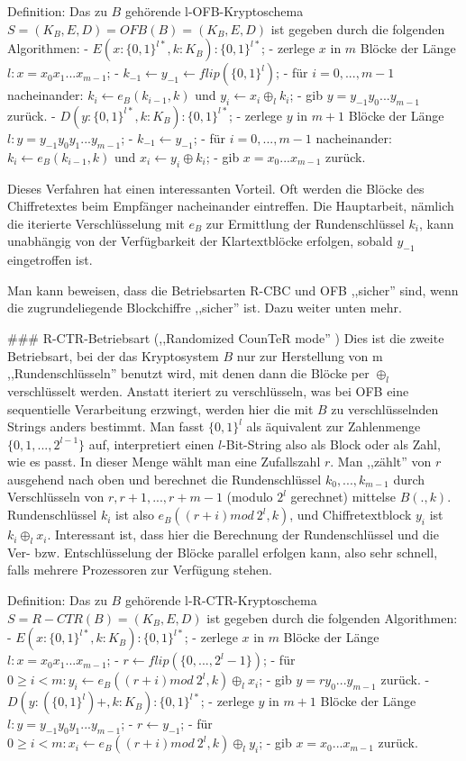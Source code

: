 \documentclass[a4paper]{article}
\begin{document}
\begin{multicols}{3}
        Definition: Das zu $B$ gehörende l-OFB-Kryptoschema $S=(K_B,E,D) =OFB(B) =(K_B,E,D)$ ist gegeben durch die folgenden Algorithmen:
        - $E(x:\{0,1\}^{l*},k:K_B) :\{0,1\}^{l*}$;
        - zerlege $x$ in $m$ Blöcke der Länge $l:x=x_0 x_1 ...x_{m-1}$;
        - $k_{-1} \leftarrow y_{-1} \leftarrow flip(\{0,1\}^l)$;
        - für $i=0,...,m-1$ nacheinander: $k_i\leftarrow e_B(k_{i-1},k)$ und $y_i\leftarrow x_i\oplus_l k_i$;
        - gib $y=y_{-1} y_0 ...y_{m-1}$ zurück.
        - $D(y:\{0,1\}^{l*},k:K_B) :\{0,1\}^{l*}$;
        - zerlege $y$ in $m+1$ Blöcke der Länge $l:y=y_{-1} y_0 y_1 ...y_{m-1}$;
        - $k_{-1} \leftarrow y_{-1}$;
        - für $i=0,...,m-1$ nacheinander: $k_i\leftarrow e_B(k_{i-1} ,k)$ und $x_i\leftarrow y_i\oplus k_i$;
        - gib $x=x_0 ...x_{m-1}$ zurück.

        Dieses Verfahren hat einen interessanten Vorteil. Oft werden die Blöcke des Chiffretextes beim Empfänger nacheinander eintreffen. Die Hauptarbeit, nämlich die iterierte Verschlüsselung mit $e_B$ zur Ermittlung der Rundenschlüssel $k_i$, kann unabhängig von der Verfügbarkeit der Klartextblöcke erfolgen, sobald $y_{-1}$ eingetroffen ist.

        Man kann beweisen, dass die Betriebsarten R-CBC und OFB ,,sicher'' sind, wenn die zugrundeliegende Blockchiffre ,,sicher'' ist. Dazu weiter unten mehr.

        ### R-CTR-Betriebsart (,,Randomized CounTeR mode'' )
        Dies ist die zweite Betriebsart, bei der das Kryptosystem $B$ nur zur Herstellung von m ,,Rundenschlüsseln'' benutzt wird, mit denen dann die Blöcke per $\oplus_l$ verschlüsselt werden. Anstatt iteriert zu verschlüsseln, was bei OFB eine sequentielle Verarbeitung erzwingt, werden hier die mit $B$ zu verschlüsselnden Strings anders bestimmt. Man fasst $\{0,1\}^l$ als äquivalent zur Zahlenmenge $\{0,1,...,2^{l-1}\}$ auf, interpretiert einen $l$-Bit-String also als Block oder als Zahl, wie es passt. In dieser Menge wählt man  eine Zufallszahl $r$. Man ,,zählt'' von $r$ ausgehend nach oben und berechnet die Rundenschlüssel $k_0,...,k_{m-1}$ durch Verschlüsseln von $r,r+1,...,r+m-1$ (modulo $2^l$ gerechnet) mittelse $B(.,k)$. Rundenschlüssel $k_i$ ist also $e_B((r+i) mod\ 2^l,k)$, und Chiffretextblock $y_i$ ist $k_i\oplus_l x_i$. Interessant ist, dass hier die Berechnung der Rundenschlüssel und die Ver- bzw. Entschlüsselung der Blöcke parallel erfolgen kann, also sehr schnell, falls mehrere Prozessoren zur Verfügung stehen.

        Definition: Das zu $B$ gehörende l-R-CTR-Kryptoschema $S=R-CTR(B) = (K_B,E,D)$ ist gegeben durch die folgenden Algorithmen:
        - $E(x:\{0,1\}^{l*},k:K_B) :\{0,1\}^{l*}$;
        - zerlege $x$ in $m$ Blöcke der Länge $l:x=x_0 x_1 ...x_{m-1}$;
        - $r\leftarrow flip(\{0,..., 2^l-1\})$;
        - für $0\geq i < m:y_i\leftarrow e_B((r+i) mod\ 2^l,k)\oplus_l x_i$;
        - gib $y=r y_0 ...y_{m-1}$ zurück.
        - $D(y: (\{0,1\}^l)+,k:K_B) :\{0,1\}^{l*}$;
        - zerlege $y$ in $m+1$ Blöcke der Länge $l:y=y_{-1} y_0 y_1 ...y_{m-1}$;
        - $r\leftarrow y_{-1}$;
        - für $0\geq i < m:x_i\leftarrow e_B((r+i) mod\ 2^l,k)\oplus_l y_i$;
        - gib $x=x_0 ...x_{m-1}$ zurück.


\end{multicols}
\end{document}
